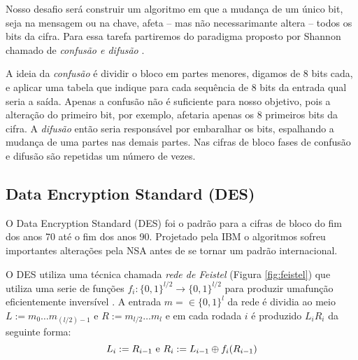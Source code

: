 Nosso desafio será construir um algoritmo em que a mudança de um único bit, seja na mensagem ou na chave, afeta -- mas não necessarimante altera -- todos os bits da cifra.
Para essa tarefa partiremos do paradigma proposto por Shannon chamado de {\em confusão e difusão} \cite{Shannon49}.

A ideia da {\em confusão} é dividir o bloco em partes menores, digamos de 8 bits cada, e aplicar uma tabela que indique para cada sequência de 8 bits da entrada qual seria a saída.
Apenas a confusão não é suficiente para nosso objetivo, pois a alteração do primeiro bit, por exemplo, afetaria apenas os 8 primeiros bits da cifra.
A {\em difusão} então seria responsável por embaralhar os bits, espalhando a mudança de uma partes nas demais partes.
Nas cifras de bloco fases de confusão e difusão são repetidas um número de vezes.

\subsection{Data Encryption Standard (DES)}
\label{sec:des}

O Data Encryption Standard (DES) foi o padrão para a cifras de bloco do fim dos anos 70 até o fim dos anos 90.
Projetado pela IBM o algoritmos sofreu importantes alterações pela NSA antes de se tornar um padrão internacional.

O DES utiliza uma técnica chamada {\em rede de Feistel} (Figura \ref{fig:feistel}) que utiliza uma serie de funções $f_i:\{0,1\}^{l/2} \to \{0,1\}^{l/2}$ para produzir umafunção eficientemente inversível \cite{Feistel73}.
A entrada $m = \in \{0,1\}^l$ da rede é dividia ao meio $L := m_0 \dots m_{(l/2)-1}$ e $R := m_{l/2} \dots m_l$ e em cada rodada $i$ é produzido $L_iR_i$ da seguinte forma:
\begin{displaymath}
  L_i := R_{i-1} \textrm{ e } R_i := L_{i-1} \oplus f_i(R_{i-1})
\end{displaymath}



